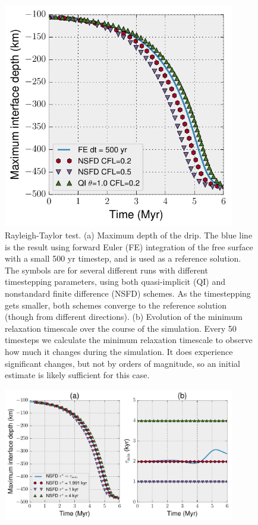 \documentclass[preprint,12pt,authoryear]{elsarticle}
\begin{document}
\begin{figure}
\includegraphics[width=0.9\textwidth]{figures/rayleigh_taylor.pdf}
\caption{Rayleigh-Taylor test. (a) Maximum depth of the drip. The blue line is the result using forward Euler (FE) integration of the free surface with a small 500 yr timestep, and is used as a reference solution. The symbols are for several different runs with different timestepping parameters, using both quasi-implicit (QI) and nonstandard finite difference (NSFD) schemes. As the timestepping gets smaller, both schemes converge to the reference solution (though from different directions). (b) Evolution of the minimum relaxation timescale over the course of the simulation. Every 50 timesteps we calculate the minimum relaxation timescale to observe how much it changes during the simulation. It does experience significant changes, but not by orders of magnitude, so an initial estimate is likely sufficient for this case.}
\label{fig:rayleigh_taylor}
\end{figure}

\begin{figure}
\includegraphics[width=0.9\textwidth]{figures/rayleigh_taylor_tau_choice.pdf}
\caption{}
\label{fig:rayleigh_taylor}
\end{figure}
\end{document}
